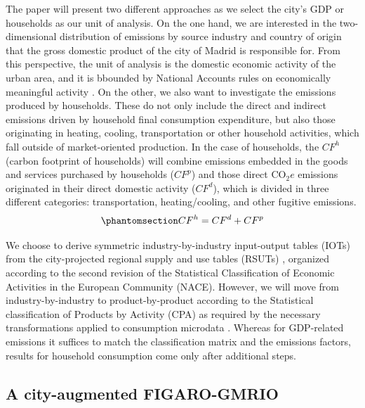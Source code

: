 \documentclass[
  10pt,
  twocolumn]{aft}
\begin{document}
The paper will present two different approaches as we select the city's
GDP or households as our unit of analysis. On the one hand, we are
interested in the two-dimensional distribution of emissions by source
industry and country of origin that the gross domestic product of the
city of Madrid is responsible for. From this perspective, the unit of
analysis is the domestic economic activity of the urban area, and it is
bbounded by National Accounts rules on economically meaningful activity
\citep{lequiller_understanding_2014, eurostat_european_2013}. On the
other, we also want to investigate the emissions produced by households.
These do not only include the direct and indirect emissions driven by
household final consumption expenditure, but also those originating in
heating, cooling, transportation or other household activities, which
fall outside of market-oriented production. In the case of households,
the \(CF^h\) (carbon footprint of households) will combine emissions
embedded in the goods and services purchased by households (\(CF^p\))
and those direct \(\text{CO}_2e\) emissions originated in their direct
domestic activity (\(CF^d\)), which is divided in three different
categories: transportation, heating/cooling, and other fugitive
emissions.
\begin{equation}\phantomsection\label{eq-carbon-footprint-households}{
CF^h =  CF^d + CF^p
}\end{equation}

We choose to derive symmetric industry-by-industry input-output tables
(IOTs) from the city-projected regional supply and use tables (RSUTs)
\citep{remond-tiedrez_eu_2019}, organized according to the second
revision of the Statistical Classification of Economic Activities in the
European Community (NACE). However, we will move from
industry-by-industry to product-by-product according to the Statistical
classification of Products by Activity (CPA) as required by the
necessary transformations applied to consumption microdata
\citep{miller_input-output_2022, cazcarro_linking_2022}. Whereas for
GDP-related emissions it suffices to match the classification matrix and
the emissions factors, results for household consumption come only after
additional steps.

\subsection{A city-augmented FIGARO-GMRIO}\label{sec-method-city}
\end{document}

